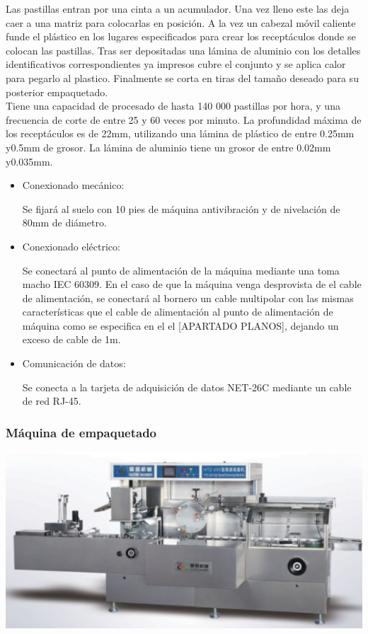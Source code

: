 	Las pastillas entran por una cinta a un acumulador. Una vez lleno este las deja caer a una matriz para colocarlas en posición. A la vez un cabezal móvil caliente funde el plástico en los lugares especificados para crear los receptáculos donde se colocan las pastillas. Tras ser depositadas una lámina de aluminio con los detalles identificativos correspondientes ya impresos cubre el conjunto y se aplica calor para pegarlo al plastico. Finalmente se corta en tiras del tamaño deseado para su posterior empaquetado.\\

	Tiene una capacidad de procesado de hasta 140 000 pastillas por hora, y una frecuencia de corte de entre 25 y 60 veces por minuto. La profundidad máxima de los receptáculos es de 22mm, utilizando una lámina de plástico de entre 0.25mm y0.5mm de grosor. La lámina de aluminio tiene un grosor de entre 0.02mm y0.035mm.


		\begin{itemize}
				\item{Conexionado mecánico:}
				
				Se fijará al suelo con 10 pies de máquina antivibración y de nivelación de 80mm de diámetro.

				\item{Conexionado eléctrico:}

				Se conectará al punto de alimentación de la máquina mediante una  toma macho IEC 60309. En el caso de que la máquina venga desprovista de el cable de alimentación, se conectará al bornero un cable multipolar con las mismas características que el cable de alimentación al punto de alimentación de máquina como se especifica en el el [APARTADO PLANOS], dejando un exceso de cable de 1m. \
				
				\item{Comunicación de datos:}

				Se conecta a la tarjeta de adquisición de datos NET-26C mediante un cable de red RJ-45.
		\end{itemize}
	
	\newpage

	\subsubsection{Máquina de empaquetado}

	\includegraphics[scale=0.6]{Datasheets/7Foto.png}
	\\	

